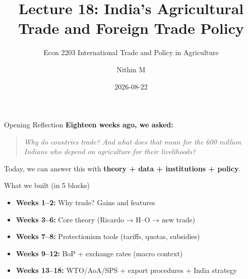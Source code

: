 \documentclass[
  ignorenonframetext,
  aspectratio=169,
]{beamer}
\title[L18 \textbar{} India Agri Trade Policy]{Lecture 18: India's
Agricultural Trade and Foreign Trade Policy}
\subtitle{Econ 2203 \textbar{} International Trade and Policy in
Agriculture}
\author{Nithin M}
\date{2026-08-22}
\institute{Department of Development Economics}
\makeatletter
\providecommand{\tightlist}{%
  \setlength{\itemsep}{0pt}\setlength{\parskip}{0pt}}
\let\quarto@originallabel\label
\DeclareRobustCommand*{\label}[1]{\quarto@originallabel{#1}}
\makeatother
\begin{document}
\frame{\titlepage}


\begin{frame}
\begin{block}{Opening Reflection}
\label{opening-reflection}
\textbf{Eighteen weeks ago, we asked:}

\begin{quote}
\emph{Why do countries trade? And what does that mean for the 600
million Indians who depend on agriculture for their livelihoods?}
\end{quote}

Today, we can answer this with \textbf{theory + data + institutions +
policy}.
\end{block}
\end{frame}

\begin{frame}
\begin{block}{What we built (in 5 blocks)}
\label{what-we-built-in-5-blocks}
\begin{itemize}
\tightlist
\item
  \textbf{Weeks 1--2:} Why trade? Gains and features
\item
  \textbf{Weeks 3--6:} Core theory (Ricardo → H--O → new trade)
\item
  \textbf{Weeks 7--8:} Protectionism tools (tariffs, quotas, subsidies)
\item
  \textbf{Weeks 9--12:} BoP + exchange rates (macro context)
\item
  \textbf{Weeks 13--18:} WTO/AoA/SPS + export procedures + India
  strategy
\end{itemize}
\end{block}
\end{frame}
\end{document}
